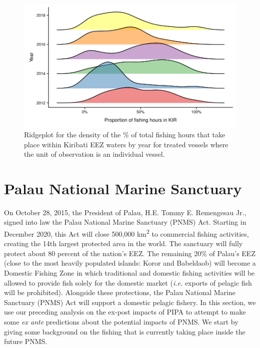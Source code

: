 \documentclass[9pttwoside,lineno]{pnas-new}
\begin{document}
\begin{figure}
\centering
	\includegraphics{img/hist_kir_fishing.pdf}
	\caption{\label{fig:hist_kir_fishing}Ridgeplot for the density of the \% of total fishing hours that take place
				within Kiribati EEZ waters by year for treated vessels where the unit of observation is an individual vessel.
}
\end{figure}


\clearpage

\section{Palau National Marine Sanctuary}\label{PNMS}


On October 28, 2015, the President of Palau, H.E. Tommy E. Remengesau Jr., signed into law the Palau National Marine Sanctuary (PNMS) Act. Starting in December 2020, this Act will close 500,000 km\textsuperscript{2} to commercial fishing activities, creating the 14th largest protected area in the world. The sanctuary will fully protect about 80 percent of the nation’s EEZ. The remaining 20\% of Palau’s EEZ (close to the most heavily populated islands: Koror and Babeldaob) will become a Domestic Fishing Zone in which traditional and domestic fishing activities will be allowed to provide fish solely for the domestic market (\emph{i.e.} exports of pelagic fish will be prohibited). Alongside these protections, the Palau National Marine Sanctuary (PNMS) Act will support a domestic pelagic fishery. In this section, we use our preceding analysis on the ex-post impacts of PIPA to attempt to make some \emph{ex ante} predictions about the potential impacts of PNMS. We start by giving some background on the fishing that is currently taking place inside the future PNMS. 
\end{document}
